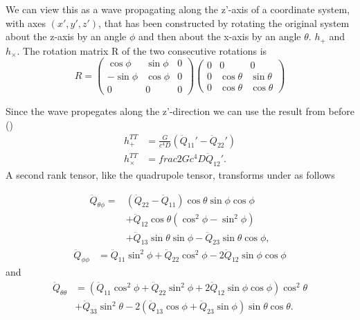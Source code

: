 We can view this as a wave propagating along the z'-axis of a coordinate system, with axes $(x',y',z')$, that has been constructed  
by rotating the original system about the z-axis by an angle $\phi$ and then about the x-axis by an angle $\theta$. $h_{+}$ and $h_{\times}$.
The rotation matrix R of the two consecutive rotations is
\begin{equation} \label{eqT:pjz}
R = 
  \begin{pmatrix}
    \cos{\phi} & \sin{\phi} & 0  \\
    -\sin{\phi} & \cos{\phi} & 0 \\
    0 & 0 & 0
  \end{pmatrix}
  \begin{pmatrix}
    0 & 0 & 0  \\
    0& \cos{\theta} & \sin{\theta} \\
    0 & \cos{\theta} & \cos{\theta}
  \end{pmatrix}
\end{equation}

Since the wave propegates along the z'-direction we can use the result from before ()
\begin{align} \label{eqT:zhchxp}
h_{+}^{TT} &= \frac{G}{c^4 D} (\ddot{Q}_{11}'-\ddot{Q}_{22}') \\ \nonumber
h_{\times}^{TT} &= frac{2G}{c^4 D} \ddot{Q}_{12}'.
\end{align}
A second rank tensor, like the quadrupole tensor, transforms under as follows

\begin{eqnarray}
\label{eq:qtp}
\ddot{Q}_{\theta \phi} =&  \left (\ddot{Q}_{22} - \ddot{Q}_{11} \right ) \cos{\theta}\sin{\phi}\cos{\phi} \nonumber \\
&+ \ddot{Q}_{12} \cos{\theta} \left (\cos^2 \phi - \sin^2 \phi \right ) \nonumber \\ 
&+ \ddot{Q}_{13} \sin \theta \sin \phi - \ddot{Q}_{23} \sin \theta \cos\phi,
\end{eqnarray}
\begin{eqnarray}
\ddot{Q}_{\phi \phi} &= \ddot{Q}_{11} \sin^2 \phi + \ddot{Q}_{22} \cos^2 \phi - 2 \ddot{Q}_{12} \sin{\phi}\cos{\phi}
\end{eqnarray}
and
\begin{eqnarray}
\ddot{Q}_{\theta \theta} &= \left ( \ddot{Q}_{11} \cos^2 \phi + \ddot{Q}_{22} \sin^2 \phi +  2 \ddot{Q}_{12} \sin{\phi} \cos{\phi} \right) \cos^2 \theta \nonumber \\
&+ \ddot{Q}_{33} \sin^2 \theta - 2 \left (\ddot{Q}_{13} \cos{\phi} + \ddot{Q}_{23} \sin{\phi} \right ) \sin{\theta} \cos{\theta}. 
\end{eqnarray}


